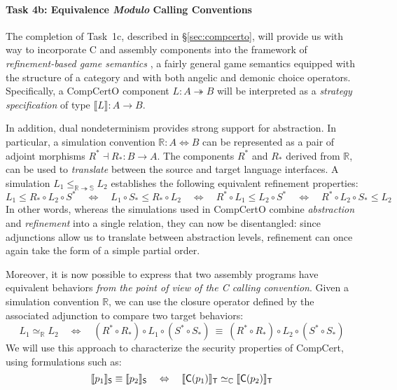 \vspace*{-2ex}
\paragraph*{Task 4b: Equivalence \emph{Modulo} Calling Conventions}

The completion of Task~1c, described in \S\ref{sec:compcerto},
will provide us with way to incorporate C and assembly components
into the framework of \emph{refinement-based game semantics} \cite{koenig20},
a fairly general game semantics
equipped with the structure of a category
and with both angelic and demonic choice operators.
Specifically,
a CompCertO component $L : A \twoheadrightarrow B$
will be interpreted as a \emph{strategy specification} of type
$\llbracket L \rrbracket : A \rightarrow B$.

In addition, dual nondeterminism provides strong support for abstraction.
In particular,
a simulation convention $\mathbb{R} : A \Leftrightarrow B$
can be represented as a pair of adjoint morphisms
$R^* \dashv R_* : B \rightarrow A$.
The components $R^*$ and $R_*$
derived from $\mathbb{R}$,
can be used
to \emph{translate} between the source and target language interfaces.
A simulation $L_1 \le_{\mathbb{R} \twoheadrightarrow \mathbb{S}} L_2$
establishes the following equivalent refinement properties:
\[
  L_1 \le R_* \circ L_2 \circ S^* \quad \Leftrightarrow \quad
  L_1 \circ S_* \le R_* \circ L_2 \quad \Leftrightarrow \quad
  R^* \circ L_1 \le L_2 \circ S^* \quad \Leftrightarrow \quad
  R^* \circ L_2 \circ S_* \le L_2
\]
In other words,
whereas the simulations used in CompCertO
combine \emph{abstraction} and \emph{refinement}
into a single relation,
they can now be disentangled:
since adjunctions allow us to translate between abstraction levels,
refinement can once again take the form of a simple partial order.

Moreover,
it is now possible to express that two assembly programs
have equivalent behaviors
\emph{from the point of view of the C calling convention}.
Given a simulation convention $\mathbb{R}$,
we can use the closure operator defined by the associated adjunction
to compare two target behaviors:
\[
  L_1 \simeq_\mathbb{R} L_2 \quad \Leftrightarrow \quad
  (R^* \circ R_*) \circ L_1 \circ (S^* \circ S_*) \:\equiv\:
  (R^* \circ R_*) \circ L_2 \circ (S^* \circ S_*)
\]
We will use this approach to characterize
the security properties of CompCert,
using formulations such as:
\[
  \llbracket p_1 \rrbracket_{ \mathsf{S} } \equiv
  \llbracket p_2 \rrbracket_{ \mathsf{S} }
  \quad \Leftrightarrow \quad
  \llbracket  \mathsf{C} (p_1) \rrbracket_{ \mathsf{T} } \simeq_\mathbb{C}
  \llbracket  \mathsf{C} (p_2) \rrbracket_{ \mathsf{T} }
\]

